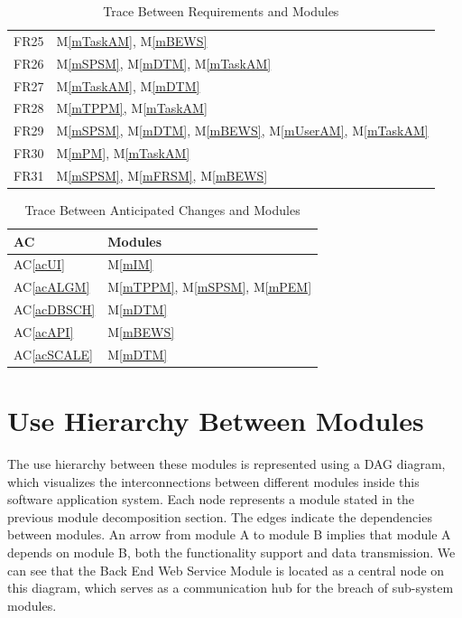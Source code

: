 \documentclass[12pt, titlepage]{article}
\newcommand{\acref}[1]{AC\ref{#1}}
\newcommand{\mref}[1]{M\ref{#1}}
\begin{document}
\begin{table}[H]
\begin{tabular}{p{} p{}}
FR25 & \mref{mTaskAM}, \mref{mBEWS}\\
FR26 & \mref{mSPSM}, \mref{mDTM}, \mref{mTaskAM}\\
FR27 & \mref{mTaskAM}, \mref{mDTM}\\
FR28 & \mref{mTPPM}, \mref{mTaskAM}\\
FR29 & \mref{mSPSM}, \mref{mDTM}, \mref{mBEWS}, \mref{mUserAM},  \mref{mTaskAM}\\
FR30 & \mref{mPM}, \mref{mTaskAM}\\
FR31 & \mref{mSPSM}, \mref{mFRSM}, \mref{mBEWS}\\
\bottomrule
\end{tabular}
\caption{Trace Between Requirements and Modules}
\label{TblRT}
\end{table}

\begin{table}[H]
\centering
\begin{tabular}{p{} p{}}
\toprule
\textbf{AC} & \textbf{Modules}\\
\midrule
\acref{acUI} & \mref{mIM}\\
\acref{acALGM} & \mref{mTPPM}, \mref{mSPSM}, \mref{mPEM}\\
\acref{acDBSCH} & \mref{mDTM}\\
\acref{acAPI} & \mref{mBEWS}\\
\acref{acSCALE} & \mref{mDTM} \\
\bottomrule
\end{tabular}
\caption{Trace Between Anticipated Changes and Modules}
\label{TblACT}
\end{table}

\section{Use Hierarchy Between Modules} \label{SecUse}
The use hierarchy between these modules is represented using a DAG diagram, which visualizes the interconnections between different modules inside this software application system. Each node represents a module stated in the previous module decomposition section. The edges indicate the dependencies between modules. An arrow from module A to module B implies that module A depends on module B, both the functionality support and data transmission. We can see that the Back End Web Service Module is located as a central node on this diagram, which serves as a communication hub for the breach of sub-system modules.
\end{document}
